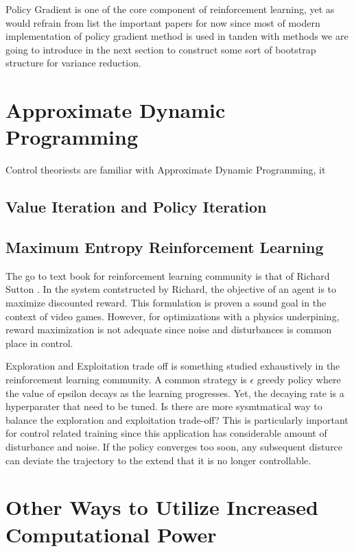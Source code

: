 \documentclass[journal]{IEEEtran}
\begin{document}
Policy Gradient is one of the core component of reinforcement learning, yet as would refrain from list the important papers for now since most of modern implementation of policy gradient method is used in tanden with methods we are going to introduce in the next section to construct some sort of bootstrap structure for variance reduction.

\section{Approximate Dynamic Programming}
Control theoriests are familiar with Approximate Dynamic Programming, it 






\subsection{Value Iteration and Policy Iteration}
\subsection{Maximum Entropy Reinforcement Learning}

The go to text book for reinforcement learning community is that of Richard Sutton \cite{Sutton1998IntroductionTR}. In the system contstructed by Richard, the objective of an agent is to maximize discounted reward. This formulation is proven a sound goal in the context of video games. However, for optimizations with a physics underpining, reward maximization is not adequate since noise and disturbances is common place in control.

Exploration and Exploitation trade off is something studied exhaustively in the reinforcement learning community. A common strategy is $\epsilon$ greedy policy where the value of epsilon decays as the learning progresses. Yet, the decaying rate is a hyperparater that need to be tuned. Is there are more sysmtmatical way to balance the exploration and exploitation trade-off? This is particularly important for control related training since this application has considerable amount of disturbance and noise. If the policy converges too soon, any subsequent disturce can deviate the trajectory to the extend that it is no longer controllable.



\section{Other Ways to Utilize Increased Computational Power}
\end{document}

